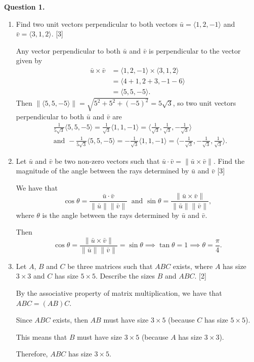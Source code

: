 \documentclass[11pt]{article}
\begin{document}
\textbf{Question 1.}
\begin{enumerate}[label=\alph*)]
    \item Find two unit vectors perpendicular to both vectors \(\bar{u} =\langle1,2,-1\rangle\) and \(\bar{v}=\langle3,1,2\rangle\). \hfill [3]
    
    \color{blue}
    Any vector perpendicular to both \(\bar{u}\) and \(\bar{v}\) is perpendicular to the vector given by
    \[
        \begin{aligned}
            \bar{u} \times \bar{v} &= \langle1,2,-1\rangle\times\langle3,1,2\rangle\\
            &=\langle4+1,2+3,-1-6\rangle\\
            &=\langle5,5,-5\rangle.
        \end{aligned}
    \]
    Then \(\|\langle5,5,-5\rangle\| = \sqrt{5^2+5^2+(-5)^2} = 5\sqrt{3}\), so two unit vectors perpendicular to both \(\bar{u}\) and \(\bar{v}\) are
    \[
    \begin{aligned}
      &\frac{1}{5\sqrt{3}}\langle5,5,-5\rangle = \frac{1}{\sqrt{3}}\langle1,1,-1\rangle = \langle\frac{1}{\sqrt{3}},\frac{1}{\sqrt{3}},-\frac{1}{\sqrt{3}}\rangle\\
        &\text{and } -\frac{1}{5\sqrt{3}}\langle5,5,-5\rangle = -\frac{1}{\sqrt{3}}\langle1,1,-1\rangle = \langle-\frac{1}{\sqrt{3}},-\frac{1}{\sqrt{3}},\frac{1}{\sqrt{3}}\rangle.  
    \end{aligned}
        \]
    \color{black}

    \item Let \(\bar{u}\) and \(\bar{v}\) be two non-zero vectors such that \(\bar{u} \cdot  \bar{v} = \|\bar{u} \times \bar{v}\|\).
    Find the magnitude of the angle between the rays determined by \(\bar{u}\) and \(\bar{v}\) \hfill [3]

    \color{blue}
    We have that \[\cos\theta = \frac{\bar{u} \cdot \bar{v}}{\|\bar{u}\|\|\bar{v}\|}\ \text{ and } \sin\theta = \frac{\|\bar{u} \times \bar{v}\|}{\|\bar{u}\|\|\bar{v}\|},\] where \(\theta\) is the angle between the rays determined by \(\bar{u}\) and \(\bar{v}\).

   Then
   \[
        \cos\theta = \frac{\|\bar{u} \times \bar{v}\|}{\|\bar{u}\|\|\bar{v}\|} = \sin\theta \implies \tan\theta = 1 \implies \theta = \frac{\pi}{4}.
   \]
    \color{black}
    \item Let \(A\), \(B\) and \(C\) be three matrices such that \(ABC\) exists, where \(A\) has size \(3\times3\) and \(C\) has size \(5\times5\).
    Describe the sizes \(B\) and \(ABC\). \hfill [2]

    \color{blue}

    By the associative property of matrix multiplication, we have that \(ABC = (AB)C\).
    
    Since \(ABC\) exists, then \(AB\) must have size \(3\times5\) (because \(C\) has size \(5\times5\)). 
    
    This means that \(B\) must have size \(3\times5\) (because \(A\) has size \(3\times3\)).

    Therefore, \(ABC\) has size \(3\times5\).
    \color{black}
\end{enumerate}
\end{document}
